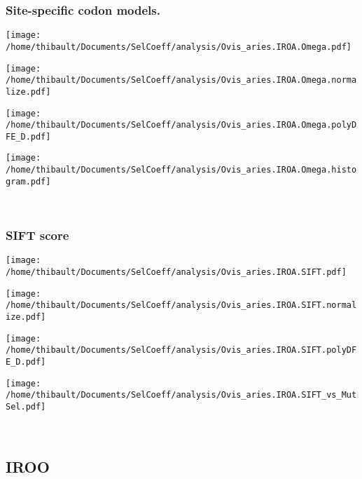 \subsubsection*{Site-specific codon models.} 
\begin{minipage}{0.49\linewidth} 
\texttt{[image: /home/thibault/Documents/SelCoeff/analysis/Ovis\_aries.IROA.Omega.pdf]} 
\end{minipage}
\begin{minipage}{0.49\linewidth} 
\texttt{[image: /home/thibault/Documents/SelCoeff/analysis/Ovis\_aries.IROA.Omega.normalize.pdf]} 
\end{minipage}
\begin{minipage}{0.49\linewidth} 
\texttt{[image: /home/thibault/Documents/SelCoeff/analysis/Ovis\_aries.IROA.Omega.polyDFE\_D.pdf]} 
\end{minipage}
\begin{minipage}{0.49\linewidth} 
\texttt{[image: /home/thibault/Documents/SelCoeff/analysis/Ovis\_aries.IROA.Omega.histogram.pdf]} 
\end{minipage}
\\ 
\subsubsection*{SIFT score} 
\begin{minipage}{0.49\linewidth} 
\texttt{[image: /home/thibault/Documents/SelCoeff/analysis/Ovis\_aries.IROA.SIFT.pdf]} 
\end{minipage}
\begin{minipage}{0.49\linewidth} 
\texttt{[image: /home/thibault/Documents/SelCoeff/analysis/Ovis\_aries.IROA.SIFT.normalize.pdf]} 
\end{minipage}
\begin{minipage}{0.49\linewidth} 
\texttt{[image: /home/thibault/Documents/SelCoeff/analysis/Ovis\_aries.IROA.SIFT.polyDFE\_D.pdf]} 
\end{minipage}
\begin{minipage}{0.49\linewidth} 
\texttt{[image: /home/thibault/Documents/SelCoeff/analysis/Ovis\_aries.IROA.SIFT\_vs\_MutSel.pdf]} 
\end{minipage}
\\ 
\subsection{IROO} 
 
